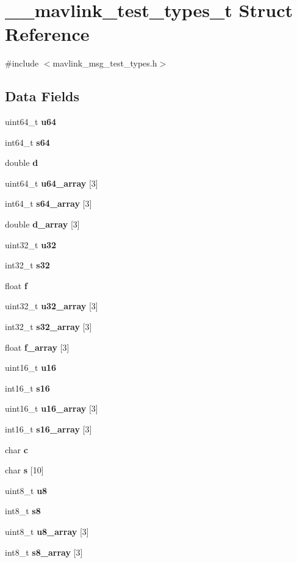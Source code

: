 \section{\+\_\+\+\_\+mavlink\+\_\+test\+\_\+types\+\_\+t Struct Reference}
\label{struct____mavlink__test__types__t}


{\ttfamily \#include $<$mavlink\+\_\+msg\+\_\+test\+\_\+types.\+h$>$}

\subsection*{Data Fields}
\begin{DoxyCompactItemize}
\item 
uint64\+\_\+t \textbf{ u64}
\item 
int64\+\_\+t \textbf{ s64}
\item 
double \textbf{ d}
\item 
uint64\+\_\+t \textbf{ u64\+\_\+array} [3]
\item 
int64\+\_\+t \textbf{ s64\+\_\+array} [3]
\item 
double \textbf{ d\+\_\+array} [3]
\item 
uint32\+\_\+t \textbf{ u32}
\item 
int32\+\_\+t \textbf{ s32}
\item 
float \textbf{ f}
\item 
uint32\+\_\+t \textbf{ u32\+\_\+array} [3]
\item 
int32\+\_\+t \textbf{ s32\+\_\+array} [3]
\item 
float \textbf{ f\+\_\+array} [3]
\item 
uint16\+\_\+t \textbf{ u16}
\item 
int16\+\_\+t \textbf{ s16}
\item 
uint16\+\_\+t \textbf{ u16\+\_\+array} [3]
\item 
int16\+\_\+t \textbf{ s16\+\_\+array} [3]
\item 
char \textbf{ c}
\item 
char \textbf{ s} [10]
\item 
uint8\+\_\+t \textbf{ u8}
\item 
int8\+\_\+t \textbf{ s8}
\item 
uint8\+\_\+t \textbf{ u8\+\_\+array} [3]
\item 
int8\+\_\+t \textbf{ s8\+\_\+array} [3]
\end{DoxyCompactItemize}


